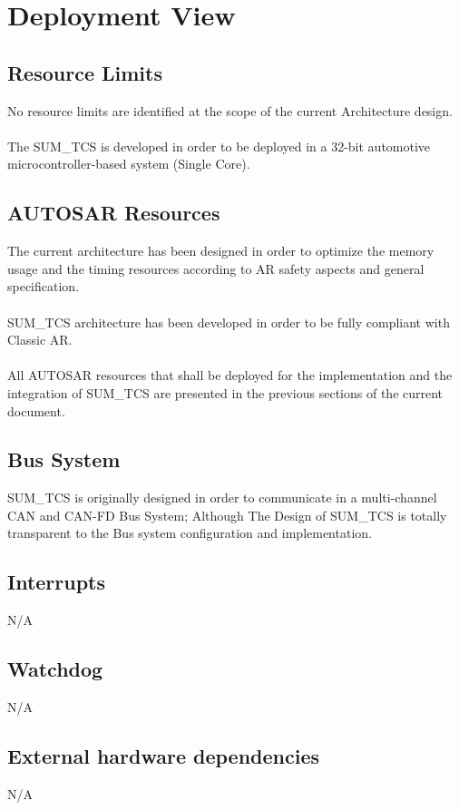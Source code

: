 \chapter{Deployment View}

\section{Resource Limits}
No resource limits are identified at the scope of the current Architecture design.
\\
\\
The SUM\_TCS is developed in order to be deployed in a 32-bit automotive microcontroller-based system (Single Core).

\section{AUTOSAR Resources}
The current architecture has been designed in order to optimize the memory usage and the timing resources according to AR safety aspects and general specification.
\\
\\SUM\_TCS architecture has been developed in order to be fully compliant with Classic AR.
\\
\\
All AUTOSAR resources that shall be deployed for the implementation and the integration of SUM\_TCS are presented in the previous sections of the current document.

\section{Bus System}
SUM\_TCS is originally designed in order to communicate in a multi-channel CAN and CAN-FD Bus System; Although The Design of SUM\_TCS is totally transparent to 
the Bus system configuration and implementation.

\section{Interrupts}
N/A

\section{Watchdog}
N/A

\section{External hardware dependencies}
N/A


